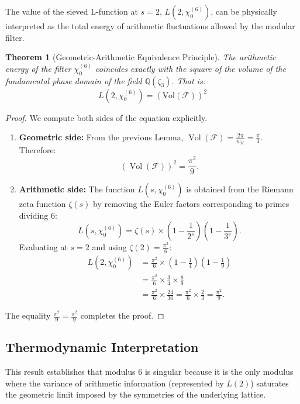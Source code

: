 \documentclass[12pt, a4paper]{article}
\theoremstyle{plain}
\newtheorem{teorema}{Theorem}[section]
\theoremstyle{definition}
\theoremstyle{remark}
\begin{document}
The value of the sieved L-function at $s=2$, $L(2, \chi_0^{(6)})$, can be physically interpreted as the total energy of arithmetic fluctuations allowed by the modular filter.

\begin{teorema}[Geometric-Arithmetic Equivalence Principle]
The arithmetic energy of the filter $\chi_0^{(6)}$ coincides exactly with the square of the volume of the fundamental phase domain of the field $\mathbb{Q}(\zeta_3)$. That is:
\[
L(2, \chi_0^{(6)}) = \left( \text{Vol}(\mathcal{F}) \right)^2
\]
\end{teorema}

\begin{proof}
We compute both sides of the equation explicitly.
\begin{enumerate}
    \item \textbf{Geometric side:}
    From the previous Lemma, $\operatorname{Vol}(\mathcal{F}) = \frac{2\pi}{w_K} = \frac{\pi}{3}$. Therefore:
    \[
    \left( \operatorname{Vol}(\mathcal{F}) \right)^2 = \frac{\pi^2}{9}.
    \]

    \item \textbf{Arithmetic side:}
    The function $L(s, \chi_0^{(6)})$ is obtained from the Riemann zeta function $\zeta(s)$ by removing the Euler factors corresponding to primes dividing 6:
    \[
    L(s, \chi_0^{(6)}) = \zeta(s) \times \left(1 - \frac{1}{2^s}\right) \left(1 - \frac{1}{3^s}\right).
    \]
    Evaluating at $s=2$ and using $\zeta(2) = \frac{\pi^2}{6}$:
    \[
    \begin{aligned}
    L(2, \chi_0^{(6)}) &= \frac{\pi^2}{6} \times \left(1 - \frac{1}{4}\right) \left(1 - \frac{1}{9}\right) \\
    &= \frac{\pi^2}{6} \times \frac{3}{4} \times \frac{8}{9} \\
    &= \frac{\pi^2}{6} \times \frac{24}{36} = \frac{\pi^2}{6} \times \frac{2}{3} = \frac{\pi^2}{9}.
    \end{aligned}
    \]
\end{enumerate}
The equality $\frac{\pi^2}{9} = \frac{\pi^2}{9}$ completes the proof. \qedhere
\end{proof}

\subsection{Thermodynamic Interpretation}

This result establishes that modulus 6 is singular because it is the only modulus where the variance of arithmetic information (represented by $L(2)$) saturates the geometric limit imposed by the symmetries of the underlying lattice.
\end{document}
